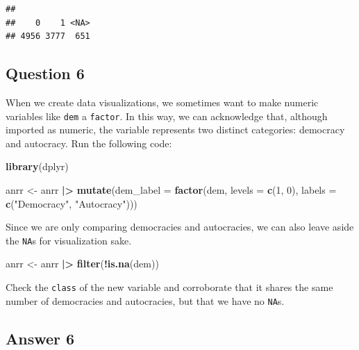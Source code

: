 \documentclass[
  11pt,
  letterpaper]{article}
\newenvironment{Shaded}{\begin{snugshade}}{\end{snugshade}}
\newcommand{\AttributeTok}[1]{\textcolor[rgb]{0.13,0.29,0.53}{#1}}
\newcommand{\DecValTok}[1]{\textcolor[rgb]{0.00,0.00,0.81}{#1}}
\newcommand{\FunctionTok}[1]{\textcolor[rgb]{0.13,0.29,0.53}{\textbf{#1}}}
\newcommand{\NormalTok}[1]{#1}
\newcommand{\OtherTok}[1]{\textcolor[rgb]{0.56,0.35,0.01}{#1}}
\newcommand{\SpecialCharTok}[1]{\textcolor[rgb]{0.81,0.36,0.00}{\textbf{#1}}}
\newcommand{\StringTok}[1]{\textcolor[rgb]{0.31,0.60,0.02}{#1}}
\begin{document}
\begin{verbatim}
## 
##    0    1 <NA> 
## 4956 3777  651
\end{verbatim}

\subsection{Question 6}\label{question-6}

When we create data visualizations, we sometimes want to make numeric
variables like \texttt{dem} a \texttt{factor}. In this way, we can
acknowledge that, although imported as numeric, the variable represents
two distinct categories: democracy and autocracy. Run the following
code:

\begin{Shaded}
\begin{Highlighting}[]
\FunctionTok{library}\NormalTok{(dplyr)}

\NormalTok{anrr }\OtherTok{\textless{}{-}}\NormalTok{ anrr }\SpecialCharTok{|\textgreater{}}
  \FunctionTok{mutate}\NormalTok{(}\AttributeTok{dem\_label =} \FunctionTok{factor}\NormalTok{(dem, }
                           \AttributeTok{levels =} \FunctionTok{c}\NormalTok{(}\DecValTok{1}\NormalTok{, }\DecValTok{0}\NormalTok{),}
                           \AttributeTok{labels =} \FunctionTok{c}\NormalTok{(}\StringTok{"Democracy"}\NormalTok{, }\StringTok{"Autocracy"}\NormalTok{)))}
\end{Highlighting}
\end{Shaded}

Since we are only comparing democracies and autocracies, we can also
leave aside the \texttt{NA}s for visualization sake.

\begin{Shaded}
\begin{Highlighting}[]
\NormalTok{anrr }\OtherTok{\textless{}{-}}\NormalTok{ anrr }\SpecialCharTok{|\textgreater{}}
  \FunctionTok{filter}\NormalTok{(}\SpecialCharTok{!}\FunctionTok{is.na}\NormalTok{(dem))}
\end{Highlighting}
\end{Shaded}

Check the \texttt{class} of the new variable and corroborate that it
shares the same number of democracies and autocracies, but that we have
no \texttt{NA}s.

\subsection{Answer 6}\label{answer-6}
\end{document}
